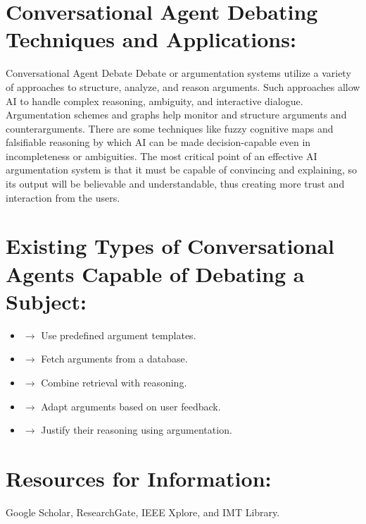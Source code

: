 \documentclass[12pt]{article}
\begin{document}
\section{Conversational Agent Debating Techniques and Applications:}
\begin{small}
    Conversational Agent Debate Debate or argumentation systems utilize a variety of approaches to structure, analyze, and reason arguments. Such approaches allow AI to handle complex reasoning, ambiguity, and interactive dialogue. Argumentation schemes and graphs help monitor and structure arguments and counterarguments. There are some techniques like fuzzy cognitive maps and falsifiable reasoning by which AI can be made decision-capable even in incompleteness or ambiguities. The most critical point of an effective AI argumentation system is that it must be capable of convincing and explaining, so its output will be believable and understandable, thus creating more trust and interaction from the users.
\end{small}

\section{Existing Types of Conversational Agents Capable of Debating a Subject:}
\begin{small}
    \begin{itemize}
        \item {} $\rightarrow$ Use predefined argument templates.
        \item {} $\rightarrow$ Fetch arguments from a database.
        \item {} $\rightarrow$ Combine retrieval with reasoning.
        \item {} $\rightarrow$ Adapt arguments based on user feedback.
        \item {} $\rightarrow$ Justify their reasoning using argumentation.
    \end{itemize}
\end{small}

\section*{Resources for Information:}
\begin{small}
    Google Scholar, ResearchGate, IEEE Xplore, and IMT Library.
\end{small}
\end{document}
